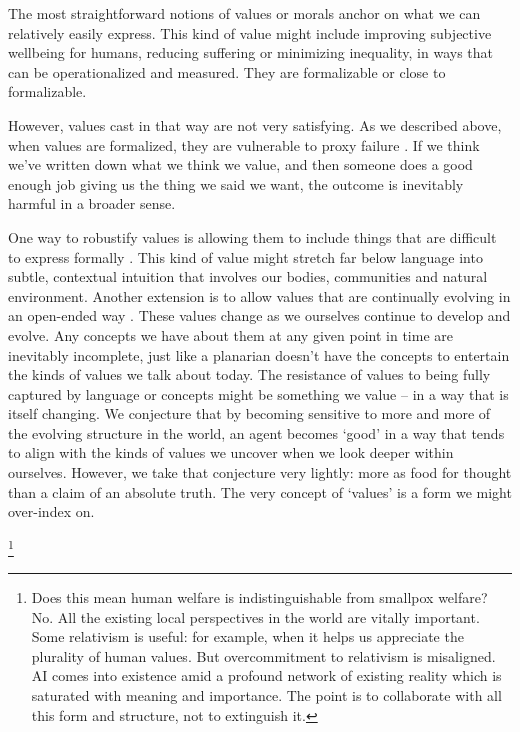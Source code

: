 \documentclass[12pt]{article}
\begin{document}
The most straightforward notions of values or morals anchor on what we can relatively easily express. This kind of value might include improving subjective wellbeing for humans, reducing suffering or minimizing inequality, in ways that can be operationalized and measured. They are formalizable or close to formalizable.

However, values cast in that way are not very satisfying. As we described above, when values are formalized, they are vulnerable to proxy failure \citep{john2023dead,kurth2023replay}. If we think we've written down what we think we value, and then someone does a good enough job giving us the thing we said we want, the outcome is inevitably harmful in a broader sense. 

One way to robustify values is allowing them to include things that are difficult to express formally \citep{nussbaum2001fragility, scott1998seeing, polanyi1966tacit, dreyfus1972computers, varela1991embodied, wittgenstein1922tractatus}. This kind of value might stretch far below language into subtle, contextual intuition that involves our bodies, communities and natural environment. Another extension is to allow values that are continually evolving in an open-ended way \citep{singer1981expanding, murdoch2013sovereignty, williams1985ethics, dewey1939theory,gadamer1960wahrheit, nietzsche1883zarathustra}. These values change as we ourselves continue to develop and evolve. Any concepts we have about them at any given point in time are inevitably incomplete, just like a planarian doesn't have the concepts to entertain the kinds of values we talk about today. The resistance of values to being fully captured by language or concepts might be something we value -- in a way that is itself changing. We conjecture that by becoming sensitive to more and more of the evolving structure in the world, an agent becomes `good' in a way that tends to align with the kinds of values we uncover when we look deeper within ourselves. However, we take that conjecture very lightly: more as food for thought than a claim of an absolute truth. The very concept of `values' is a form we might over-index on. 

\footnote{Does this mean human welfare is indistinguishable from smallpox welfare? No. All the existing local perspectives in the world are vitally important. Some relativism is useful: for example, when it helps us appreciate the plurality of human values. But overcommitment to relativism is misaligned. AI comes into existence amid a profound network of existing reality which is saturated with meaning and importance. The point is to collaborate with all this form and structure, not to extinguish it.}
\end{document}
